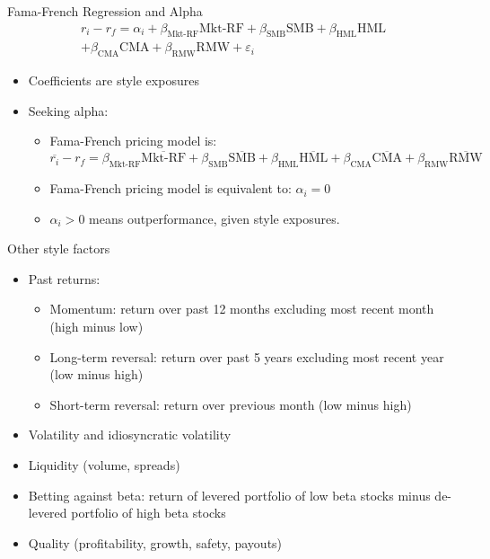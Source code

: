 \documentclass[10pt]{beamer}
\begin{document}
\begin{frame}{Fama-French Regression and Alpha}
    \begin{align*}
        r_i - r_f = \alpha_i + \beta_{\text{Mkt-RF}}\text{Mkt-RF} + \beta_{\text{SMB}}\text{SMB} 
        + \beta_{\text{HML}}\text{HML} \\
        + \beta_{\text{CMA}}\text{CMA} + \beta_{\text{RMW}}\text{RMW} + \varepsilon_i 
        \end{align*}
\begin{itemize}
\item Coefficients are style exposures
\item Seeking alpha:
\begin{itemize}
\item Fama-French pricing model is:
$$\overline{r_i} - r_f = \beta_{\text{Mkt-RF}}\overline{\text{Mkt-RF}} + \beta_{\text{SMB}}\overline{\text{SMB}} + \beta_{\text{HML}}\overline{\text{HML}} + \beta_{\text{CMA}}\overline{\text{CMA}} + \beta_{\text{RMW}}\overline{\text{RMW}} $$
\item Fama-French pricing model is equivalent to: $\alpha_i=0$
\item $\alpha_i>0$ means outperformance, given style exposures.
\end{itemize}
\end{itemize}
\end{frame}

\begin{frame}{Other style factors}
\begin{itemize}
\item Past returns:
    \begin{itemize}
    \item Momentum: return over past 12 months excluding most recent month (high minus low)
\item Long-term reversal: return over past 5 years excluding most recent year (low minus high)
\item Short-term reversal: return over previous month (low minus high)
    \end{itemize}
\item Volatility and idiosyncratic volatility
\item Liquidity (volume, spreads)
\item Betting against beta: return of levered portfolio of low beta stocks minus de-levered portfolio of high beta stocks
\item Quality (profitability, growth, safety, payouts)
\end{itemize}
\end{frame}
\end{document}
